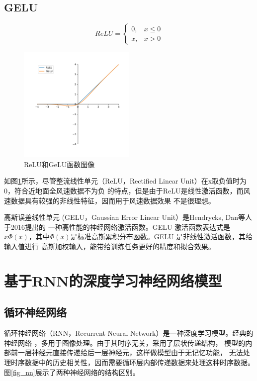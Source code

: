 \documentclass[AutoFakeBold]{LZUThesis}
\begin{document}
\subsection{GELU}
$$
ReLU=
\left\{\begin{matrix}
    0, & x \leq 0 \\
    x, & x > 0
\end{matrix}\right.
$$

\begin{figure}[H]
	\centering
    \includegraphics[width=0.5\textwidth]{figures/relu_gelu.pdf}
    \caption{ReLU和GeLU函数图像}
    \label{fig_relu_gelu}
\end{figure}

如图\ref{fig_relu_gelu}所示，尽管整流线性单元（ReLU，Rectified Linear Unit）在x取负值时为0，符合近地面全风速数据不为负
的特点，但是由于ReLU是线性激活函数，而风速数据具有较强的非线性特征，因而用于风速数据效果
不是很理想。

高斯误差线性单元 (GELU，Gaussian Error Linear Unit）是Hendrycks, Dan等人于2016提出的
\cite{hendrycks2016gaussian}一种高性能的神经网络激活函数。GELU 激活函数表达式是
$x\Phi(x)$，其中$\Phi(x)$是标准高斯累积分布函数。GELU 是非线性激活函数，其给输入值进行
高斯加权输入，能带给训练任务更好的精度和拟合效果。

\section{基于RNN的深度学习神经网络模型}
\subsection{循环神经网络}
循环神经网络（RNN，Recurrent Neural Network）是一种深度学习模型。经典的神经网络
\cite{rumelhart1986learning}，多用于图像处理。由于其时序无关，采用了层状传递结构，
模型的内部前一层神经元直接传递给后一层神经元，这样做模型由于无记忆功能，
无法处理时序数据中的历史相关性，因而需要循环层内部传递数据来处理这种时序数据。
图\ref{fig_nn}展示了两种神经网络的结构区别。
\end{document}
